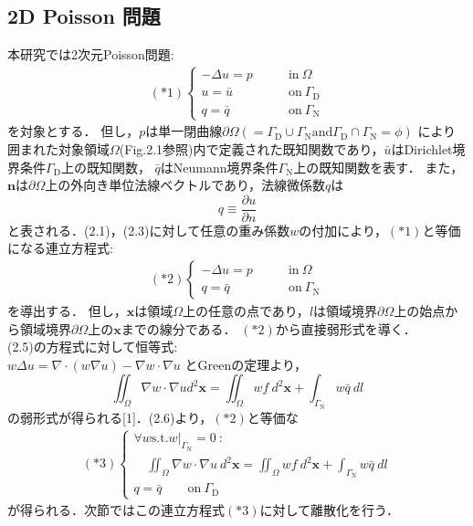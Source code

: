 \documentclass[twocolumn,head_space=15.0mm,foot_space=15.0mm,fleqn]{jlreq}
\numberwithin{equation}{section}
\begin{document}
\subsection{2D Poisson 問題}
本研究では2次元Poisson問題:
\begin{align}
	\left( *1 \right)
	\begin{cases}
		-\Delta u = p &\qquad \text{in} \ \Omega \\
		u = \bar{u} &\qquad \text{on} \ \Gamma_{\mathrm{D}} \\
		q = \bar{q} &\qquad \text{on} \ \Gamma_{\mathrm{N}}
	\end{cases}
\end{align}
を対象とする．
但し，$p$は単一閉曲線$\partial \Omega \left( =\Gamma_{\mathrm{D}} \cup \Gamma_{\mathrm{N}} \text{and} \Gamma_{\mathrm{D}} \cap \Gamma_{\mathrm{N}} = \phi \right)$
により囲まれた対象領域$\Omega$(Fig.2.1参照)内で定義された既知関数であり，$\bar{u}$はDirichlet境界条件$\Gamma_{\mathrm{D}}$上の既知関数，
$\bar{q}$はNeumann境界条件$\Gamma_{\mathrm{N}}$上の既知関数を表す．
また，$\boldsymbol{n}$は$\partial \Omega$上の外向き単位法線ベクトルであり，法線微係数$q$は
\begin{equation}
	q \equiv \frac{ \partial u }{\partial n }
\end{equation}
と表される．(2.1)，(2.3)に対して任意の重み係数$w$の付加により，$\left(*1\right)$と等価になる連立方程式:
\begin{align}
	\left( *2 \right)
	\begin{cases}
		-\Delta u = p &\qquad \text{in} \ \Omega \\
		q = \bar{q} &\qquad \text{on} \ \Gamma_{\mathrm{N}}
	\end{cases}
\end{align}
を導出する．
但し，$\boldsymbol{x}$は領域$\Omega$上の任意の点であり，$l$は領域境界$\partial \Omega$上の始点から領域境界$\partial \Omega$上の$\boldsymbol{x}$までの線分である．
$\left( *2 \right)$から直接弱形式を導く． \\
(2.5)の方程式に対して恒等式: \\
$w \Delta u = \nabla \cdot \left( w \nabla u \right) - \nabla w \cdot \nabla u$ とGreenの定理より，
\begin{equation}
	\iint_{\Omega} \nabla w \cdot \nabla u d^2 \boldsymbol{x} = \iint_{\Omega} wf \ d^2 \boldsymbol{x} + \int_{\Gamma_{\mathrm{N}}} w \bar{q} \ dl
\end{equation}
の弱形式が得られる[1]．(2.6)より，$ \left( *2 \right) $と等価な \newpage
\begin{align*}
	\left( *3 \right)
	\begin{cases}
		\forall w \text{s.t.} w|_{\Gamma_{\mathrm{N}}}=0 \ : \\
		  \quad \iint_{\Omega} \nabla w \cdot \nabla u \ d^2 \boldsymbol{x} = \iint_{\Omega} wf \ d^2 \boldsymbol{x} + \int_{\Gamma_{\mathrm{N}}} w \bar{q} \ dl \\
		q = \bar{q} \qquad \text{on} \ \Gamma_{\mathrm{D}}
	\end{cases}
\end{align*}
が得られる．次節ではこの連立方程式$\left( *3 \right)$に対して離散化を行う．
\end{document}
